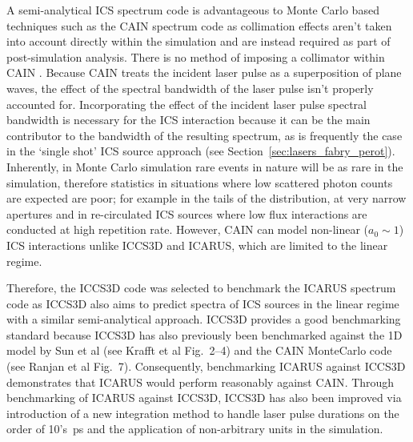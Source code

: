 \documentclass[../main.tex]{subfiles}
\begin{document}
A semi-analytical ICS spectrum code is advantageous to Monte Carlo based techniques such as the \textsc{CAIN} spectrum code as collimation effects aren't taken into account directly within the simulation and are instead required as part of post-simulation analysis. There is no method of imposing a collimator within \textsc{CAIN} \cite{chen1995cain}. Because \textsc{CAIN} treats the incident laser pulse as a superposition of plane waves, the effect of the spectral bandwidth of the laser pulse isn't properly accounted for. Incorporating the effect of the incident laser pulse spectral bandwidth is necessary for the ICS interaction because it can be the main contributor to the bandwidth of the resulting spectrum, as is frequently the case in the `single shot' ICS source approach (see Section~\ref{sec:lasers_fabry_perot}). Inherently, in Monte Carlo simulation rare events in nature will be as rare in the simulation, therefore statistics in situations where low scattered photon counts are expected are poor; for example in the tails of the distribution, at very narrow apertures \cite{ranjan2018simulation} and in re-circulated ICS sources where low flux interactions are conducted at high repetition rate. However, \textsc{CAIN} can model non-linear ($a_{0} \sim 1$) ICS interactions unlike \textsc{ICCS3D} and \textsc{ICARUS}, which are limited to the linear regime.  

Therefore, the \textsc{ICCS3D} code \cite{krafft2016laser,ranjan2018simulation} was selected to benchmark the \textsc{ICARUS} spectrum code as \textsc{ICCS3D} also aims to predict spectra of ICS sources in the linear regime with a similar semi-analytical approach. \textsc{ICCS3D} provides a good benchmarking standard because  \textsc{ICCS3D} has also previously been benchmarked against the 1D model by Sun et al \cite{sun2009energy} (see Krafft et al \cite{krafft2016laser} Fig.~2--4) and the \textsc{CAIN} MonteCarlo code (see Ranjan et al\cite{ranjan2018simulation} Fig.~7). Consequently, benchmarking \textsc{ICARUS} against \textsc{ICCS3D} demonstrates that \textsc{ICARUS} would perform reasonably against \textsc{CAIN}. Through benchmarking of \textsc{ICARUS} against \textsc{ICCS3D}, \textsc{ICCS3D} has also been improved via introduction of a new integration method to handle laser pulse durations on the order of 10's~\si{\pico\second} and the application of non-arbitrary units in the simulation.
\end{document}
